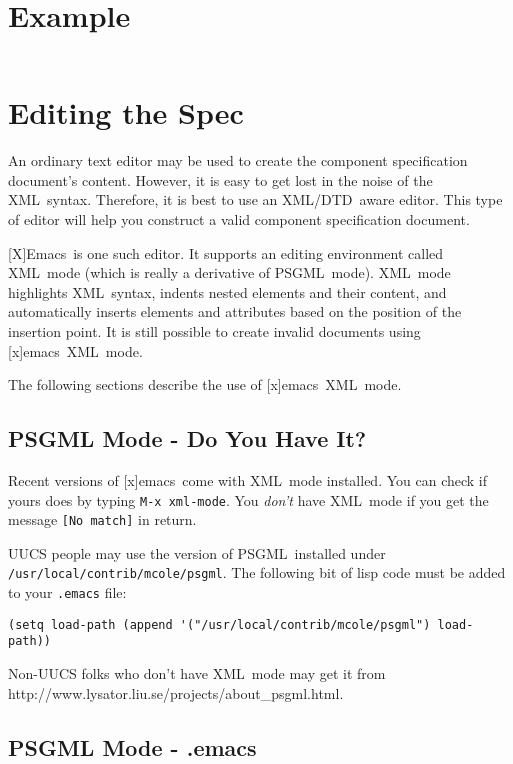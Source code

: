 \documentclass{article}
\newcommand{\acronym}[1]{#1}
\newcommand{\filename}[1]{\texttt{#1}}
\newcommand{\xml}{\acronym{XML}}
\newcommand{\Xml}{\xml}
\newcommand{\psgml}{\acronym{PSGML}}
\newcommand{\dtd}{\acronym{DTD}}
\newcommand{\emacs}{[x]emacs}
\newcommand{\Emacs}{[X]Emacs}
\newcommand{\keyboard}[1]{\texttt{#1}}
\newcommand{\screen}[1]{\texttt{#1}}
\newcommand{\psgmlurl}{http://www.lysator.liu.se/projects/about\_psgml.html}
\newcommand{\SECexample}{Example}
\newcommand{\SECediting}{Editing the Spec}
\newcommand{\SUBSECgettingSources}{PSGML Mode - Do You Have It?}
\newcommand{\SUBSECdotEmacs}{PSGML Mode - .emacs}
\begin{document}
\section{\SECexample}
\label{\SECexample}
\begin{verbatim}
\end{verbatim}


\section{\SECediting}
\label{\SECediting}

An ordinary text editor may be used to create the component specification
document's content.  However, it is easy to get lost in the noise of the
\xml\ syntax.  Therefore, it is best to use an \xml{}/\dtd\ aware editor.
This type of editor will help you construct a valid component specification
document.

\Emacs\ is one such editor.  It supports an editing environment called
\xml\ mode (which is really a derivative of \psgml\ mode).  \Xml\ mode
highlights \xml\ syntax, indents nested elements and their content, and
automatically inserts elements and attributes based on the position of the
insertion point.  It is still possible to create invalid documents using
\emacs\ \xml\ mode.

The following sections describe the use of \emacs\ \xml\ mode.

\subsection{\SUBSECgettingSources}
\label{\SUBSECgettingSources}

Recent versions of \emacs\ come with \xml\ mode installed.  You can check
if yours does by typing \keyboard{M-x xml-mode}.  You \emph{don't} have
\xml\ mode if you get the message
\screen{[No match]} in return.

UUCS people may use the version of \psgml\ installed under
\keyboard{/usr/local/contrib/mcole/psgml}.  The following bit of lisp code
must be added to your \filename{.emacs} file:

\begin{verbatim}
(setq load-path (append '("/usr/local/contrib/mcole/psgml") load-path))
\end{verbatim}

Non-UUCS folks who don't have \xml\ mode may get it from \psgmlurl.

\subsection{\SUBSECdotEmacs}
\label{\SUBSECdotEmacs}
\end{document}
